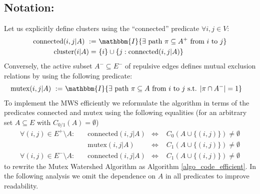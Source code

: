 \subsection*{Notation:}
Let us explicitly define clusters using the ``connected'' predicate $\forall i,j \in V$: 
\begin{align*}
\mathrm{connected}(i, j | A)\,\,:= \,\, & \mathbbm{I}\{\exists \textrm{ path } \pi \subseteq A^+ \textrm{ from }i\textrm{ to }j\}\\ %
\mathrm{cluster}(i | A) = \,\, &  \{i\} \cup \{j: \mathrm{connected}(i,j | A) \}
\end{align*}
Conversely, the active subset $A^-\subseteq E^-$ of repulsive edges defines mutual exclusion relations by using the following predicate:
\begin{align*}
\mathrm{mutex}(i, j | A) \,\,:= \,\, & \mathbbm{I}\{ \exists \textrm{ path } \pi \subseteq A \textrm{ from }i\textrm{ to }j \textrm{ s.t.  }|\pi \cap A^-| = 1\} \nonumber
\end{align*}
To implement the MWS efficiently we reformulate the algorithm in terms of the predicates $\mathrm{connected}$ and $\mathrm{mutex}$ using the following equalities (for an arbitrary set 
$A \subseteq E$ with ${C}_{0/1}(A) =  \emptyset$)
\begin{align*}
\forall (i, j) \in E^+\setminus A:\quad &
\!\!\!\mathrm{connected}(i, j | A)\!\!\!\!\!& \Leftrightarrow & \,\, {C}_{0}(A\cup \{(i, j)\}) \neq \emptyset\\
&\!\!\!\mathrm{mutex}(i, j | A)\!\!\!\!\!&\Leftrightarrow & \,\, {C}_{1}(A\cup \{(i, j)\}) \neq \emptyset\\
\forall (i, j) \in E^-\setminus A:\quad&
\!\!\!\mathrm{connected}(i, j | A)\!\!\!\!\!&\Leftrightarrow & \,\, {C}_{1}(A\cup \{(i, j)\}) \neq \emptyset
\end{align*} to rewrite the Mutex Watershed Algorithm as Algorithm \ref{algo_code_efficient}. In the following analysis we omit the dependence on $A$ in all predicates to improve readability.

